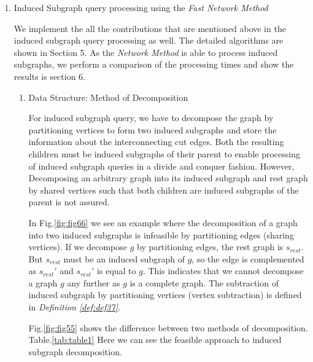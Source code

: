 \begin{enumerate}
\begin{enumerate}

\end{enumerate}


\item Induced Subgraph query processing using the \textit{Fast Network Method}


We implement the all the contributions that are mentioned above in the induced subgraph query processing as well. The detailed algorithms are shown in Section 5. As the \textit{Network Method} is able to process 
induced subgraphs, we perform a comparison of the processing times and show the results is section 6. 

\begin{enumerate}


\item Data Structure: Method of Decomposition

For induced subgraph query, we have to decompose the graph by partitioning vertices to form two induced subgraphs and store the information about the interconnecting cut edges. 
Both the resulting children must be induced subgraphs of their parent to enable processing of induced subgraph queries in a divide and conquer fashion. 
However, Decomposing an arbitrary graph into its induced subgraph and rest graph by shared vertices such that both children are induced subgraphs of the parent is not assured.


In Fig.\ref{fig:fig66} we see an example where the decomposition of a graph into two induced subgraphs is infeasible by partitioning edges (sharing vertices).
If we decompose $g$ by partitioning edges, the rest graph is $s_{rest}$. But $s_{rest}$ must be an induced subgraph of $g$, so the edge is complemented as $s_{rest}'$ and $s_{rest}'$ is equal to $g$. 
This indicates that we cannot decompose a graph $g$ any further as $g$ is a complete graph.
The subtraction of induced subgraph by partitioning vertices (vertex subtraction)  is defined in \textit{Definition \ref{def:def37}}.


Fig.\ref{fig:fig55} shows the difference between two methods of decomposition.
Table.\ref{tab:table1} Here we can see the feasible approach to induced subgraph decomposition.



\end{enumerate}
\end{enumerate}
